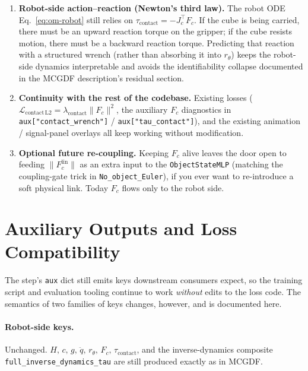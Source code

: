 \documentclass[11pt]{article}
\begin{document}
\begin{enumerate}
  \item \textbf{Robot-side action--reaction (Newton's third law).}
    The robot ODE
    Eq.~\eqref{eq:om-robot} still relies on
    $\tau_{\mathrm{contact}} = -J_c^\top F_c$.  If the cube is being
    carried, there must be an upward reaction torque on the gripper;
    if the cube resists motion, there must be a backward reaction
    torque.  Predicting that reaction with a structured wrench (rather
    than absorbing it into $r_\theta$) keeps the robot-side dynamics
    interpretable and avoids the identifiability collapse documented
    in the MCGDF description's residual section.
  \item \textbf{Continuity with the rest of the codebase.}  Existing
    losses
    ($\mathcal{L}_{\mathrm{contact\,L2}} = \lambda_{\mathrm{contact}}\|F_c\|^2$,
    the auxiliary $F_c$ diagnostics in
    \texttt{aux["contact\_wrench"]} / \texttt{aux["tau\_contact"]}),
    and the existing animation / signal-panel overlays all keep
    working without modification.
  \item \textbf{Optional future re-coupling.}  Keeping $F_c$ alive
    leaves the door open to feeding $\|F_c^{\mathrm{lin}}\|$ as an
    extra input to the \texttt{ObjectStateMLP} (matching the
    coupling-gate trick in \texttt{No\_object\_Euler}), if you ever
    want to re-introduce a soft physical link.  Today $F_c$ flows
    only to the robot side.
\end{enumerate}

\section{Auxiliary Outputs and Loss Compatibility}
\label{sec:om-aux}

The step's \texttt{aux} dict still emits keys downstream consumers
expect, so the training script and evaluation tooling continue to
work \emph{without} edits to the loss code.  The semantics of two
families of keys changes, however, and is documented here.

\paragraph{Robot-side keys.}  Unchanged.  $H,\,c,\,g,\,
\ddot q,\,r_\theta,\,F_c,\,\tau_{\mathrm{contact}}$, and the
inverse-dynamics composite \texttt{full\_inverse\_dynamics\_tau} are
still produced exactly as in MCGDF.
\end{document}
